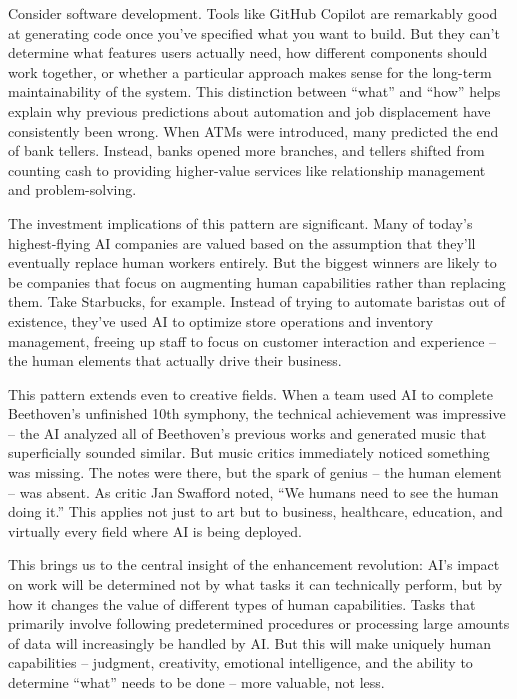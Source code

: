 \documentclass[
  Letterpaper,
]{scrbook}
\begin{document}
Consider software development. Tools like GitHub Copilot are remarkably
good at generating code once you've specified what you want to build.
But they can't determine what features users actually need, how
different components should work together, or whether a particular
approach makes sense for the long-term maintainability of the system.
This distinction between ``what'' and ``how'' helps explain why previous
predictions about automation and job displacement have consistently been
wrong. When ATMs were introduced, many predicted the end of bank
tellers. Instead, banks opened more branches, and tellers shifted from
counting cash to providing higher-value services like relationship
management and problem-solving.

The investment implications of this pattern are significant. Many of
today's highest-flying AI companies are valued based on the assumption
that they'll eventually replace human workers entirely. But the biggest
winners are likely to be companies that focus on augmenting human
capabilities rather than replacing them. Take Starbucks, for example.
Instead of trying to automate baristas out of existence, they've used AI
to optimize store operations and inventory management, freeing up staff
to focus on customer interaction and experience -- the human elements
that actually drive their business.

This pattern extends even to creative fields. When a team used AI to
complete Beethoven's unfinished 10th symphony, the technical achievement
was impressive -- the AI analyzed all of Beethoven's previous works and
generated music that superficially sounded similar. But music critics
immediately noticed something was missing. The notes were there, but the
spark of genius -- the human element -- was absent. As critic Jan
Swafford noted, ``We humans need to see the human doing it.'' This
applies not just to art but to business, healthcare, education, and
virtually every field where AI is being deployed.

This brings us to the central insight of the enhancement revolution:
AI's impact on work will be determined not by what tasks it can
technically perform, but by how it changes the value of different types
of human capabilities. Tasks that primarily involve following
predetermined procedures or processing large amounts of data will
increasingly be handled by AI. But this will make uniquely human
capabilities -- judgment, creativity, emotional intelligence, and the
ability to determine ``what'' needs to be done -- more valuable, not
less.
\end{document}
